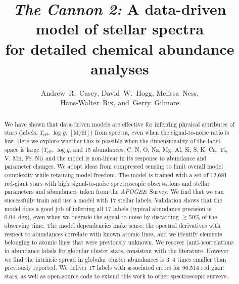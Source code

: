 \documentclass[12pt,preprint]{aastex}
\newcommand{\project}[1]{\textsl{#1}}
\newcommand{\acronym}[1]{{\small{#1}}}
\newcommand{\apogee}{\project{\acronym{APOGEE}}}
\newcommand{\logg}{\log g}
\newcommand{\mh}{\mathrm{[M/H]}}
\newcommand{\Teff}{T_{\mathrm{eff}}}
\begin{document}
\title{\textsl{The Cannon 2:} A data-driven model of stellar spectra \\
       for detailed chemical abundance analyses}
\author{Andrew~R.~Casey,
        David~W.~Hogg,
        Melissa~Ness,\\
        Hans-Walter~Rix,
    and~Gerry~Gilmore}


\begin{abstract}
We have shown that data-driven models are effective for inferring physical 
attributes of stars (labels; $\Teff$, $\logg$, $\mh$) from spectra, even when
the signal-to-noise ratio is low.
Here we explore whether this is possible when the dimensionality of the label
space is large ($\Teff$, $\logg$, and 15 abundances: C, N, O, Na, Mg, Al, Si, S, 
K, Ca, Ti, V, Mn, Fe, Ni) and the model is non-linear in its response to 
abundance and parameter changes.
We adopt ideas from compressed sensing to limit overall model complexity
while retaining model freedom.  The model is trained
with a set of 12,681 red-giant stars with high signal-to-noise spectroscopic 
observations and stellar parameters and abundances taken from the \apogee\ 
Survey.
We find that we can successfully train and use a model with 17 stellar labels.
Validation shows that the model does a good job of inferring all 17 labels 
(typical abundance precision is 0.04~dex), even when we degrade the signal-to-noise by 
discarding $\gtrsim$50\% of the observing time. The model dependencies 
make sense: the spectral derivatives with respect to abundances correlate
with known atomic lines, and we identify elements belonging
to atomic lines that were previously unknown.  We recover (anti-)correlations
in abundance labels for globular cluster stars, consistent with the literature.
However we find the intrinsic spread in globular cluster abundances is 3--4 times smaller than 
previously reported.  We deliver 17 labels with associated errors for 
96,514 red giant stars, as well as open-source code to extend this work to other spectroscopic surveys.
\end{abstract}
\end{document}
